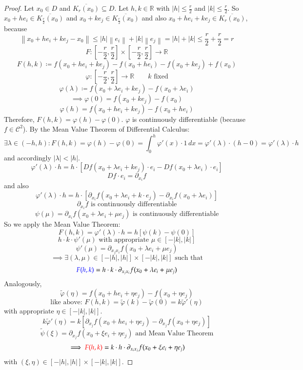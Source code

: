 \documentclass{article}
\newcommand{\norm}[1]{\left\|#1\right\|}
\newcommand{\card}[1]{\left|#1\right|}
\begin{document}
\begin{proof}
  Let $x_0 \in D$ and $\overline{K_r(x_0)} \subseteq D$. Let $h, k \in \mathbb R$ with $\card{h} \leq \frac r2$ and $\card{k} \leq \frac r2$.
  So $x_0 + h e_i \in \overline{K_{\frac r2}(x_0)}$ and $x_0 + ke_j \in \overline{K_{\frac r2}(x_0)}$ and also
  $x_0 + he_i + ke_j \in \overline{K_r(x_0)}$, because
  \[ \norm{x_0 + he_i + ke_j - x_0} \leq \card{h} \norm{e_i} + \card{k} \norm{e_j} = \card{h} + \card{k} \leq \frac r2 + \frac r2 = r \]
  \[ F: \left[-\frac r2, \frac r2\right] \times \left[-\frac r2, \frac r2\right] \to \mathbb R \]
  \[ F(h, k) \coloneqq f(x_0 + he_i + ke_j) - f(x_0 + he_i) - f(x_0 + ke_j) + f(x_0) \]
  \[ \varphi: \left[-\frac r2, \frac r2\right] \to \mathbb R \qquad \text{$k$ fixed}  \]
  \[ \varphi(\lambda) \coloneqq f(x_0 + \lambda e_i + ke_j) - f(x_0 + \lambda e_i) \]
  \[ \implies \varphi(0) = f(x_0 + ke_j) - f(x_0) \]
  \[ \varphi(h) = f(x_0 + he_i + ke_j) - f(x_0 + he_i) \]
  Therefore, $F(h, k) = \varphi(h) - \varphi(0)$.
  $\varphi$ is continuously differentiable (because $f \in \mathcal C^2$).
  By the Mean Value Theorem of Differential Calculus:
  \[ \exists \lambda \in (-h, h): F(h, k) = \varphi(h) - \varphi(0) = \int_0^h \varphi'(x) \cdot 1 \, dx = \varphi'(\lambda) \cdot (h - 0) = \varphi'(\lambda) \cdot h \]
  and accordingly $\card{\lambda} < \card{h}$.
  \[ \varphi'(\lambda) \cdot h = h \cdot [Df(x_0 + \lambda e_i + ke_j) \cdot e_i - Df(x_0 + \lambda e_i) \cdot e_i] \]
  \[ Df \cdot e_i = \partial_{x_i} f \]
  and also 
  \[ \varphi'(\lambda) \cdot h = h \cdot [\partial_{x_i} f(x_0 + \lambda e_i + k \cdot e_j) - \partial_{x_i} f (x_0 + \lambda e_i)] \]
  \[ \partial_{x_i} f \text{ is continuously differentiable} \]
  \[ \psi(\mu) = \partial_{x_i} f(x_0 + \lambda e_i + \mu e_j) \text{ is continuously differentiable} \]
  So we apply the Mean Value Theorem:
  \[ F(h,k) = \varphi'(\lambda) \cdot h = h [\psi(k) - \psi(0)] \]
  \[ h \cdot k \cdot \psi'(\mu) \text{ with appropriate } \mu \in \left[-\card{k}, \card{k}\right] \]
  \[ \psi'(\mu) = \partial_{x_j x_i} f(x_0 + \lambda e_i + \mu e_j) \]
  \[ \implies \exists (\lambda, \mu) \in \left[-\card{h}, \card{h}\right] \times \left[-\card{k}, \card{k}\right] \text{ such that} \]
  \[ {\color{blue} F(h, k)} = h \cdot k \cdot \partial_{x_j x_i} f(x_0 + \lambda e_i + \mu e_j) \]
  Analogously,
  \[ \tilde \varphi(\eta) = f(x_0 + he_i + \eta e_j) - f(x_0 + \eta e_j) \]
  \[ \text{like above: } F(h,k) = \tilde \varphi(k) - \tilde \varphi(0) = k\tilde \varphi'(\eta) \]
  with appropriate $\eta \in \left[-\card{k}, \card{k}\right]$.
  \[ k \tilde \varphi'(\eta) = k \left[\partial_{x_j} f(x_0 + he_i + \eta e_j) - \partial_{x_j} f(x_0 + \eta e_j)\right] \]
  \[ \tilde \psi(\xi) = \partial_{x_j} f(x_0 + \xi e_i + \eta e_j) \text{ and Mean Value Theorem} \]
  \[ \implies {\color{red} F(h, k)} = k \cdot h \cdot \partial_{x_i x_j} f(x_0 + \xi e_i + \eta e_j) \]
  with $(\xi, \eta) \in [-\card{h}, \card{h}] \times [-\card{k}, \card{k}]$.


\end{proof}
\end{document}
